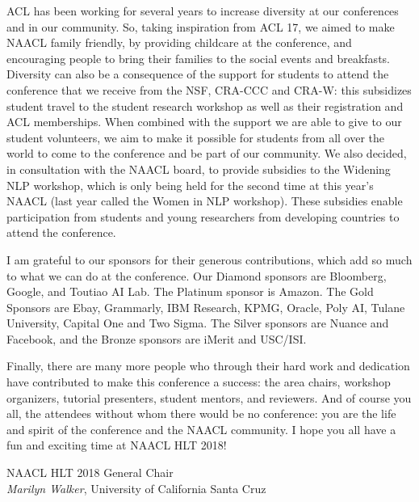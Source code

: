 ACL has been working for several years to increase diversity at our
conferences and in our community. So, taking inspiration from ACL 17,
we aimed to make NAACL family friendly, by providing childcare at the
conference, and encouraging people to bring their families to the
social events and breakfasts. Diversity can also be a consequence of
the support for students to attend the conference that we receive from
the NSF, CRA-CCC and CRA-W: this subsidizes student travel to the student
research workshop as well as their registration and ACL
memberships. When combined with the support we are able to give to our
student volunteers, we aim to make it possible for students from all
over the world to come to the conference and be part of our
community. We also decided, in consultation with the NAACL board, to
provide subsidies to the Widening NLP workshop, which is only being
held for the second time at this year's NAACL (last year called the
Women in NLP workshop).  These subsidies enable participation from
students and young researchers from developing countries to attend the
conference.


I am grateful to our sponsors for their generous contributions, which
add so much to what we can do at the conference. Our Diamond sponsors
are Bloomberg, Google, and Toutiao AI Lab. The Platinum
sponsor is Amazon. The Gold Sponsors are Ebay, Grammarly, IBM Research, KPMG, Oracle, Poly AI,
Tulane University, Capital One and Two Sigma. The Silver sponsors are Nuance and
Facebook, and the Bronze sponsors are iMerit and USC/ISI.

Finally, there are many more people who through their hard work and
dedication have contributed to make this conference a success: the
area chairs, workshop organizers, tutorial presenters, student
mentors, and reviewers. And of course you all, the attendees without
whom there would be no conference: you are the life and spirit of the
conference and the NAACL community. I hope you all have a
fun and exciting time at NAACL HLT 2018!

\noindent NAACL HLT 2018 General Chair \\
{\it Marilyn Walker}, University of California Santa Cruz 
